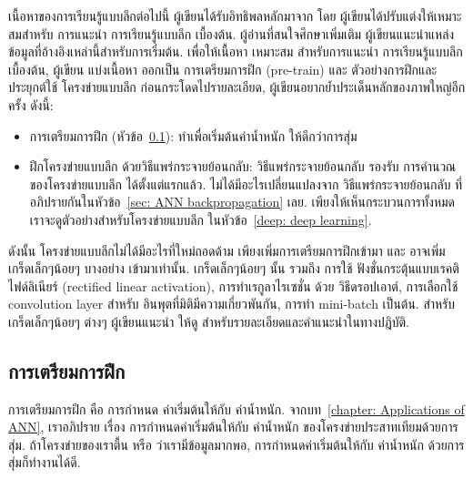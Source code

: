 เนื้อหาของการเรียนรู้แบบลึกต่อไปนี้ ผู้เขียนได้รับอิทธิพลหลักมาจาก 
\cite{LarochelleEtAl2007a, Larochelle2013a, Hinton2013a, Ng2012a}
โดย ผู้เขียนได้ปรับแต่งให้เหมาะสมสำหรับ การแนะนำ การเรียนรู้แบบลึก เบื้องต้น.
ผู้อ่านที่สนใจศึกษาเพิ่มเติม ผู้เขียนแนะนำแหล่งข้อมูลที่อ้างอิงเหล่านี้สำหรับการเริ่มต้น.
เพื่อให้เนื้อหา เหมาะสม สำหรับการแนะนำ การเรียนรู้แบบลึกเบื้องต้น,
ผู้เขียน แบ่งเนื้อหา ออกเป็น การเตรียมการฝึก (pre-train) และ ตัวอย่างการฝึกและประยุกต์ใช้ โครงข่ายแบบลึก
ก่อนกระโดดไปรายละเอียด, ผู้เขียนอยากย้ำประเด็นหลักของภาพใหญ่อีกครั้ง ดังนี้:
\begin{itemize}
\item การเตรียมการฝึก (หัวข้อ~\ref{deep: pre train}): ทำเพื่อเริ่มต้นค่าน้ำหนัก ให้ดีกว่าการสุ่ม
\item ฝึกโครงข่ายแบบลึก ด้วยวิธีแพร่กระจายย้อนกลับ:
วิธีแพร่กระจายย้อนกลับ รองรับ การคำนวณของโครงข่ายแบบลึก ได้ตั้งแต่แรกแล้ว.
ไม่ได้มีอะไรเปลี่ยนแปลงจาก วิธีแพร่กระจายย้อนกลับ ที่อภิปรายกันในหัวข้อ~\ref{sec: ANN backpropagation} เลย.
เพียงให้เห็นกระบวนการทั้งหมด เราจะดูตัวอย่างสำหรับโครงข่ายแบบลึก ในหัวข้อ~\ref{deep: deep learning}.
\end{itemize}
ดังนั้น โครงข่ายแบบลึกไม่ได้มีอะไรที่ใหม่ถอดด้าม เพียงเพิ่มการเตรียมการฝึกเข้ามา และ อาจเพิ่ม เกร็ดเล็กๆน้อยๆ บางอย่าง เข้ามาเท่านั้น.
เกร็ดเล็กๆน้อยๆ นั้น รวมถึง การใช้ ฟังชั่นกระตุ้นแบบเรคติไฟด์ลิเนียร์ (rectified linear activation)\cite{HintonBrainSexML}, การทำเรกูลาไรเซชั่น ด้วย วิธีดรอปเอาต์\cite{DahlSainathHinton2013a}, การเลือกใช้ convolution layer\cite{CouprieEtAl2014a} สำหรับ อินพุตที่มิติมีความเกี่ยวพันกัน, การทำ mini-batch\cite{HintonRecipe} เป็นต้น.
สำหรับเกร็ดเล็กๆน้อยๆ ต่างๆ ผู้เขียนแนะนำ ให้ดู \cite{HintonRecipe} สำหรับรายละเอียดและคำแนะนำในทางปฎิบัติ.

\subsection{การเตรียมการฝึก}
\label{deep: pre train}

การเตรียมการฝึก คือ การกำหนด ค่าเริ่มต้นให้กับ ค่าน้ำหนัก.
จากบท~\ref{chapter: Applications of ANN}, เราอภิปราย เรื่อง การกำหนดค่าเริ่มต้นให้กับ ค่าน้ำหนัก ของโครงข่ายประสาทเทียมด้วยการสุ่ม.
ถ้าโครงข่ายของเราตื้น หรือ ว่าเรามีข้อมูลมากพอ, การกำหนดค่าเริ่มต้นให้กับ ค่าน้ำหนัก ด้วยการสุ่มก็ทำงานได้ดี.

